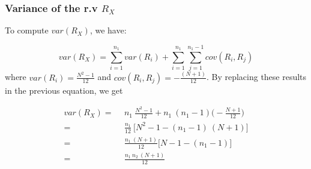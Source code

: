 \documentclass[border=5mm, convert, usenames, dvipsnames,beamer]{standalone}
\begin{document}
\begin{frame}
\frametitle{Variance of the  r.v $R_{X}$ }

\vspace{40}
\noindent
To compute $var(R_{X})$, we have:


$$var(R_{X})= \sum_{i=1}^{n_{1}}var(R_{i}) + \sum_{i=1}^{n_{1}} \sum_{j=1}^{n_{1}-1}cov(R_{i},R_{j}) $$ where $ var(R_{i})= \frac{N^2 -1}{12} $ and $ cov(R_{i},R_{j})=- \frac{(N+1)}{12}$. By replacing these results in the previous equation, we get 

\begin{align*} 
var(R_{X}) =& \ \ n_{1} \ \frac{N^2 -1}{12} + n_{1} \ (n_{1} -1) \bigg(-\frac{N+1}{12} \bigg)\\
=& \ \ \frac{n_{1}}{12} \ \bigg[  N^2 -1 - (n_{1}-1) \ (N+1) \bigg] \\
=& \ \ \frac{n_{1} \ (N+1)}{12} \bigg[ N -1 - (n_{1} -1) \bigg]  \\
=& \ \ \frac{n_{1} \ n_{2}\ (N+1)}{12} 
\end{align*}




\end{frame}




\end{document}
